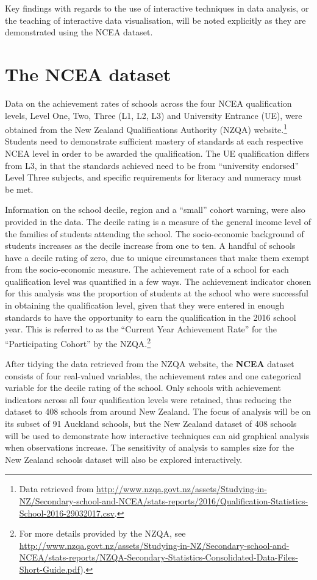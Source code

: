 \documentclass[]{book}
\let\rmarkdownfootnote\footnote%
\def\footnote{\protect\rmarkdownfootnote}
\theoremstyle{definition}
\theoremstyle{definition}
\theoremstyle{definition}
\theoremstyle{remark}
\begin{document}
\begin{boxed}
Key findings with regards to the use of interactive techniques in data
analysis, or the teaching of interactive data visualisation, will be
noted explicitly as they are demonstrated using the NCEA dataset.
\end{boxed}

\section{The NCEA dataset}\label{the-ncea-dataset}

Data on the achievement rates of schools across the four NCEA
qualification levels, Level One, Two, Three (L1, L2, L3) and University
Entrance (UE), were obtained from the New Zealand Qualifications
Authority (NZQA) website.\footnote{Data retrieved from
  \url{http://www.nzqa.govt.nz/assets/Studying-in-NZ/Secondary-school-and-NCEA/stats-reports/2016/Qualification-Statistics-School-2016-29032017.csv}.}
Students need to demonstrate sufficient mastery of standards at each
respective NCEA level in order to be awarded the qualification. The UE
qualification differs from L3, in that the standards achieved need to be
from ``university endorsed'' Level Three subjects, and specific
requirements for literacy and numeracy must be met.

Information on the school decile, region and a ``small'' cohort warning,
were also provided in the data. The decile rating is a measure of the
general income level of the families of students attending the school.
The socio-economic background of students increases as the decile
increase from one to ten. A handful of schools have a decile rating of
zero, due to unique circumstances that make them exempt from the
socio-economic measure. The achievement rate of a school for each
qualification level was quantified in a few ways. The achievement
indicator chosen for this analysis was the proportion of students at the
school who were successful in obtaining the qualification level, given
that they were entered in enough standards to have the opportunity to
earn the qualification in the 2016 school year. This is referred to as
the ``Current Year Achievement Rate'' for the ``Participating Cohort''
by the NZQA.\footnote{For more details provided by the NZQA, see
  \url{http://www.nzqa.govt.nz/assets/Studying-in-NZ/Secondary-school-and-NCEA/stats-reports/NZQA-Secondary-Statistics-Consolidated-Data-Files-Short-Guide.pdf}).}

After tidying the data retrieved from the NZQA website, the
\textbf{NCEA} dataset consists of four real-valued variables, the
achievement rates and one categorical variable for the decile rating of
the school. Only schools with achievement indicators across all four
qualification levels were retained, thus reducing the dataset to 408
schools from around New Zealand. The focus of analysis will be on its
subset of 91 Auckland schools, but the New Zealand dataset of 408
schools will be used to demonstrate how interactive techniques can aid
graphical analysis when observations increase. The sensitivity of
analysis to samples size for the New Zealand schools dataset will also
be explored interactively.
\end{document}

